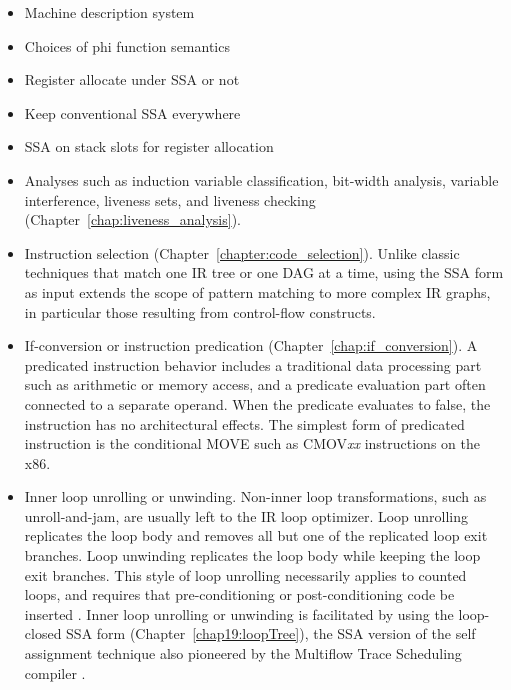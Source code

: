 \begin{itemize}

\item Machine description system

\item Choices of phi function semantics

\item Register allocate under SSA or not

\item Keep conventional SSA everywhere

\item SSA on stack slots for register allocation

\end{itemize}

\begin{itemize}

\item Analyses such as induction variable classification, bit-width analysis,
variable interference, liveness sets, and liveness checking
(Chapter~\ref{chap:liveness_analysis}).

\item Instruction selection (Chapter~\ref{chapter:code_selection}). Unlike
classic techniques that match one IR tree or one DAG at a time, using the SSA
form as input extends the scope of pattern matching to more complex IR graphs,
in particular those resulting from control-flow constructs.

\item If-conversion or instruction predication
(Chapter~\ref{chap:if_conversion}). A predicated instruction behavior includes a
traditional data processing part such as arithmetic or memory access, and a
predicate evaluation part often connected to a separate operand. When the
predicate evaluates to false, the instruction has no architectural effects. The
simplest form of predicated instruction is the conditional MOVE such as
CMOV\emph{xx} instructions on the x86. 

\item Inner loop unrolling or unwinding. Non-inner loop transformations, such as
unroll-and-jam, are usually left to the IR loop optimizer. Loop unrolling
replicates the loop body and removes all but one of the replicated loop exit
branches. Loop unwinding replicates the loop body while keeping the loop exit
branches. This style of loop unrolling necessarily applies to counted loops, and
requires that pre-conditioning or post-conditioning code be inserted
\cite{Lownet:1992:JS}. Inner loop unrolling or unwinding is facilitated by using
the loop-closed SSA form (Chapter~\ref{chap19:loopTree}), the SSA version of the
self assignment technique also pioneered by the Multiflow Trace Scheduling
compiler \cite{Lownet:1992:JS}.


\end{itemize}

